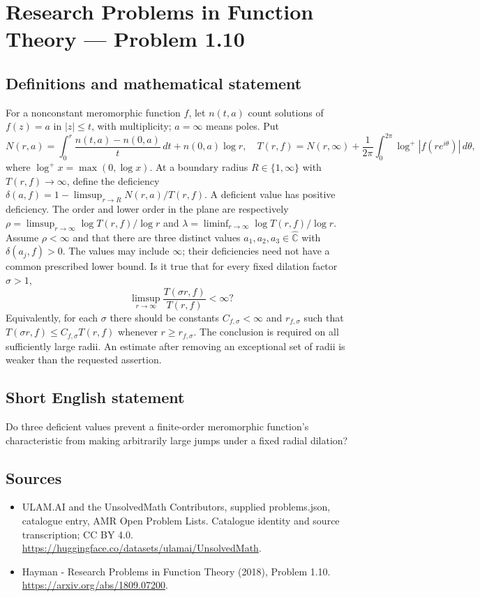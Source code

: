 \documentclass[11pt,a4paper]{article}
\begin{document}
\section*{Research Problems in Function Theory — Problem 1.10}\label{statement}

\subsection{Definitions and mathematical statement}
For a nonconstant meromorphic function $f$, let $n(t,a)$ count solutions of $f(z)=a$ in $|z|\le t$, with multiplicity; $a=\infty$ means poles. Put
\[
N(r,a)=\int_0^r\frac{n(t,a)-n(0,a)}t\,dt+n(0,a)\log r,
\quad T(r,f)=N(r,\infty)+\frac1{2\pi}\int_0^{2\pi}\log^+|f(re^{i\theta})|\,d\theta,
\]
where $\log^+x=\max(0,\log x)$. At a boundary radius $R\in\{1,\infty\}$ with $T(r,f)\to\infty$, define the deficiency
$\delta(a,f)=1-\limsup_{r\to R}N(r,a)/T(r,f)$. A deficient value has positive deficiency. The order and lower order in the plane are respectively
$\rho=\limsup_{r\to\infty}\log T(r,f)/\log r$ and
$\lambda=\liminf_{r\to\infty}\log T(r,f)/\log r$.
Assume $\rho<\infty$ and that there are three distinct values $a_1,a_2,a_3\in\widehat{\mathbb C}$ with $\delta(a_j,f)>0$. The values may include $\infty$; their deficiencies need not have a common prescribed lower bound.
Is it true that for every fixed dilation factor $\sigma>1$,
\[
\limsup_{r\to\infty}\frac{T(\sigma r,f)}{T(r,f)}<\infty?
\]
Equivalently, for each $\sigma$ there should be constants $C_{f,\sigma}<\infty$ and $r_{f,\sigma}$ such that $T(\sigma r,f)\le C_{f,\sigma}T(r,f)$ whenever $r\ge r_{f,\sigma}$. The conclusion is required on all sufficiently large radii. An estimate after removing an exceptional set of radii is weaker than the requested assertion.
\subsection{Short English statement}
Do three deficient values prevent a finite-order meromorphic function's characteristic from making arbitrarily large jumps under a fixed radial dilation?
\subsection{Sources}
\begin{itemize}
\item[S1] ULAM.AI and the UnsolvedMath Contributors, supplied problems.json, catalogue entry, AMR Open Problem Lists. Catalogue identity and source transcription; CC BY 4.0.
\url{https://huggingface.co/datasets/ulamai/UnsolvedMath}.
\item[S2] Hayman - Research Problems in Function Theory (2018), Problem 1.10. 
\url{https://arxiv.org/abs/1809.07200}.
\end{itemize}
\end{document}
